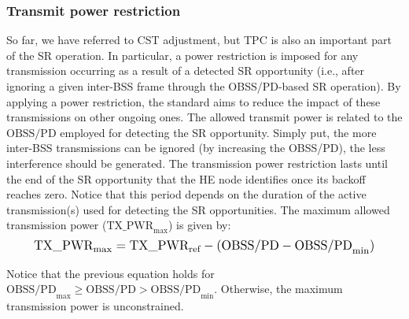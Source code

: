\documentclass[comsoc]{IEEEtran}
\begin{document}
	\subsubsection{Transmit power restriction}	\label{section:tx_power_restriction}
	So far, we have referred to CST adjustment, but TPC is also an important part of the SR operation. In particular, a power restriction is imposed for any transmission occurring as a result of a detected SR opportunity (i.e., after ignoring a given inter-BSS frame through the OBSS/PD-based SR operation). By applying a power restriction, the standard aims to reduce the impact of these transmissions on other ongoing ones. The allowed transmit power is related to the $\text{OBSS/PD}$ employed for detecting the SR opportunity. Simply put, the more inter-BSS transmissions can be ignored (by increasing the OBSS/PD), the less interference should be generated. The transmission power restriction lasts until the end of the SR opportunity that the HE node identifies once its backoff reaches zero. Notice that this period depends on the duration of the active transmission(s) used for detecting the SR opportunities. The maximum allowed transmission power ($\text{TX\_PWR}_{\max}$) is given by:
	\begin{equation}
	\resizebox{.9\columnwidth}{!}{$\text{TX\_PWR}_{\max} = \text{TX\_PWR}_{\text{ref}} - (\text{OBSS/PD} -\text{OBSS/PD}_{\min})$}
	\label{eq:power_restriction}
	\end{equation}
	
	Notice that the previous equation holds for $\text{OBSS/PD}_{\max} \geq \text{OBSS/PD} > \text{OBSS/PD}_{\min}$. Otherwise, the maximum transmission power is unconstrained.
	
\end{document}
